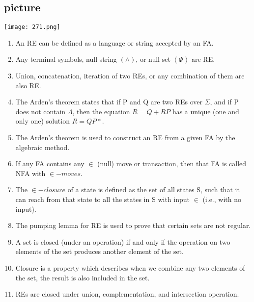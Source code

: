 \documentclass[8pt]{beamer}
\begin{document}
\begin{frame}

\begin{center}
\section{picture}
\texttt{[image: 271.png]}
\end{center}


\small{
\begin{enumerate}
  \item An RE can be defined as a language or string accepted by an FA.\\
  \item Any terminal symbols, null string $(\wedge)$, or null set $(\Phi)$ are RE.\\
  \item Union, concatenation, iteration of two REs, or any combination of them are also RE.\\
  \item The Arden's theorem states that if P and Q are two REs over $\Sigma$, and if P does not contain $\Lambda$, then
the equation $R = Q + RP$ has a unique (one and only one) solution $R = QP*$.\\
  \item The Arden’s theorem is used to construct an RE from a given FA by the algebraic method.\\
  \item If any FA contains any $\in$ (null) move or transaction, then that FA is called NFA with $\in-moves$.\\
  \item The $\in-closure$ of a state is defined as the set of all states S, such that it can reach from that state to
all the states in S with input $\in$ (i.e., with no input).\\
  \item The pumping lemma for RE is used to prove that certain sets are not regular.\\
  \item A set is closed (under an operation) if and only if the operation on two elements of the set produces
another element of the set.\\
  \item Closure is a property which describes when we combine any two elements of the set, the result is
also included in the set.\\
  \item REs are closed under union, complementation, and intersection operation.\\
\end{enumerate}
}
\end{frame}
\end{document}
